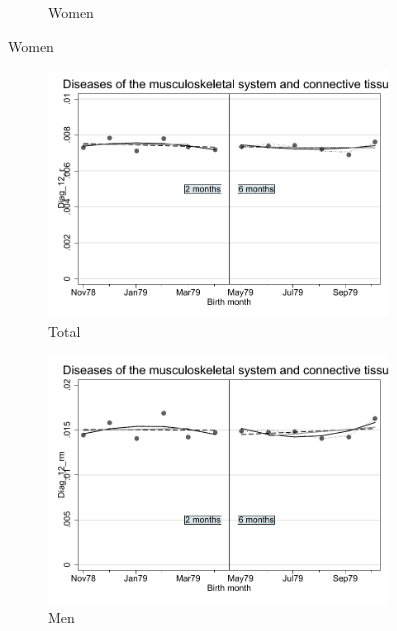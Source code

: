 \documentclass[a4paper ]{article}
\begin{document}
\begin{figure}[h!]
\begin{subfigure}[t]{0.31\textwidth}
		\caption{Women}
	\end{subfigure}
\end{figure}
\newpage
\begin{figure}[h]
	\centering
	\begin{subfigure}[t]{0.31\textwidth}
		\centering
		\includegraphics[width=0.99\textwidth]{R1_RD_Diag_12_r_fits}
		\caption{Total}		
	\end{subfigure}
	\begin{subfigure}[t]{0.31\textwidth}
		\centering
		\includegraphics[width=0.99\textwidth]{R1_RD_Diag_12_rm_fits}
		\caption{Men}		
	\end{subfigure}
	\quad
	\begin{subfigure}[t]{0.31\textwidth}

\end{subfigure}
\end{figure}
\end{document}
